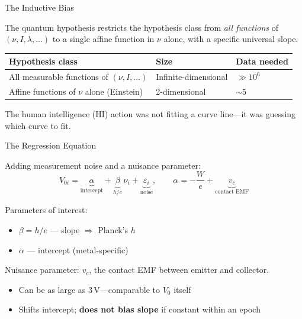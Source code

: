 \documentclass[aspectratio=169]{beamer}
\begin{document}
\begin{frame}{The Inductive Bias}

The quantum hypothesis restricts the hypothesis class from \emph{all
functions} of $(\nu, I, \lambda, \ldots)$ to a single affine
function in $\nu$ alone, with a specific universal slope.

\bigskip
\begin{center}
\begin{tabular}{lll}
\toprule
Hypothesis class & Size & Data needed \\
\midrule
All measurable functions of $(\nu, I, \ldots)$ & Infinite-dimensional & $\gg 10^6$ \\
Affine functions of $\nu$ alone (Einstein) & 2-dimensional & $\sim 5$ \\
\bottomrule
\end{tabular}
\end{center}

\bigskip
The human intelligence (HI)  action  was not fitting a curve  line---it was
guessing which curve to fit.

\end{frame}

\begin{frame}{The Regression Equation}

Adding measurement noise and a nuisance parameter:
\[
  V_{0i} = \underbrace{\alpha}_{\text{intercept}} +
            \underbrace{\beta}_{h/e}\,\nu_i +
            \underbrace{\varepsilon_i}_{\text{noise}},
  \qquad
  \alpha = -\frac{W}{e} + \underbrace{v_c}_{\text{contact EMF}}
\]

\medskip
Parameters of interest:
\begin{itemize}
  \item $\beta = h/e$ --- slope $\Rightarrow$ Planck's $h$
  \item $\alpha$ --- intercept (metal-specific)
\end{itemize}

\medskip
Nuisance parameter: $v_c$, the contact EMF between emitter and collector.
\begin{itemize}
  \item Can be as large as 3\,V---comparable to $V_0$ itself
  \item Shifts intercept; \textbf{does not bias slope} if constant within an epoch
  \end{itemize}

\end{frame}
\end{document}
